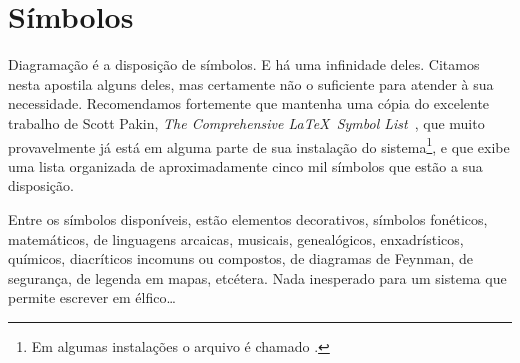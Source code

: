 \section{Símbolos}

Diagramação é a disposição de símbolos. E há uma infinidade
deles. Citamos nesta apostila alguns deles, mas certamente não o
suficiente para atender à sua necessidade. Recomendamos fortemente que
mantenha uma cópia do excelente trabalho de Scott Pakin, \emph{The
  Comprehensive  \LaTeX\ Symbol
  List}~\cite{Pakin2008}, que muito provavelmente
já está em alguma parte de sua instalação do sistema\footnote{Em
  algumas instalações o arquivo é chamado .},
e que exibe uma lista organizada de aproximadamente cinco mil símbolos
que estão a sua disposição. 

Entre os símbolos disponíveis, estão elementos decorativos, símbolos
fonéticos, matemáticos, de linguagens arcaicas, musicais,
genealógicos, enxadrísticos, químicos, diacríticos incomuns ou
compostos, de diagramas de Feynman, de segurança, de legenda em mapas,
etcétera. Nada inesperado para um sistema que permite escrever em
élfico\ldots

